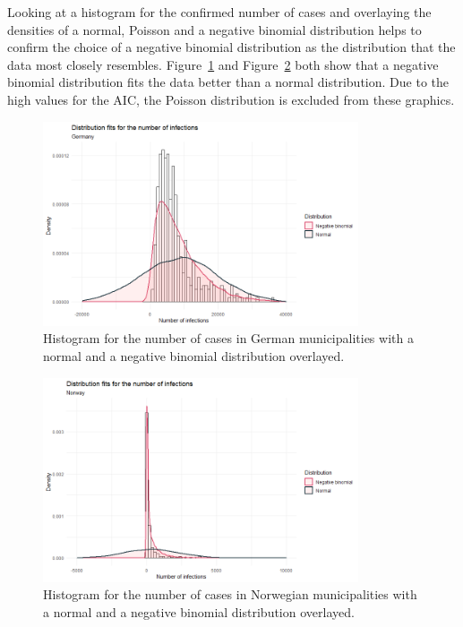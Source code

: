 Looking at a histogram for the confirmed number of cases and overlaying the densities of a normal, Poisson and a negative binomial distribution helps to confirm the choice of a negative binomial distribution as the distribution that the data most closely resembles. Figure~\ref{fitDistrGermany} and Figure~\ref{fitDistrNorway} both show that a negative binomial distribution fits the data better than a normal distribution. Due to the high values for the AIC, the Poisson distribution is excluded from these graphics.
\begin{figure}[H]
  \centering
  \includegraphics[width = 0.83\textwidth]{distrfit_germany.png}  
  \caption{Histogram for the number of cases in German municipalities with a normal and a negative binomial distribution overlayed.}
  \label{fitDistrGermany}
\end{figure}
\begin{figure}[H]
  \centering
  \includegraphics[width = 0.83\textwidth]{distrfit_norway.png}
  \caption{Histogram for the number of cases in Norwegian municipalities with a normal and a negative binomial distribution overlayed.}
  \label{fitDistrNorway}
\end{figure}
\clearpage
